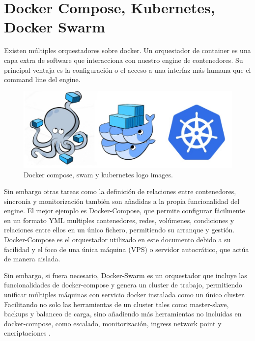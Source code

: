 \section{Docker Compose, Kubernetes, Docker Swarm}
Existen múltiples orquestadores sobre docker. Un orquestador de container es una capa extra de software que interacciona con nuestro engine de contenedores. Su principal ventaja es la configuración o el acceso a una interfaz más humana que el command line del engine. 

\begin{figure}[!htb]
\begin{center}
\includegraphics[width=1\textwidth]{./figuras/docker_compose_swam_kubernates.jpg}
\caption{Docker compose, swam y kubernetes logo images\cite{i_orquestadores}.}
\label{F:docker_compose_swam_kubernates}
\end{center}
\end{figure}
Sin embargo otras tareas como la definición de relaciones entre contenedores, sincronía y monitorización también son añadidas a la propia funcionalidad del engine. El mejor ejemplo es Docker-Compose\cite{c_docker_compose}, que permite configurar fácilmente en un formato YML multiples contenedores, redes, volúmenes, condiciones y relaciones entre ellos en un único fichero, permitiendo su arranque y gestión. Docker-Compose es el orquestador utilizado en este documento debido a su facilidad y el foco de una única máquina (VPS) o servidor autocrático, que actúa de manera aislada.

Sin embargo, si fuera necesario, Docker-Swarm\cite{c_docker_swarm} es un orquestador que incluye las funcionalidades de docker-compose y genera un cluster de trabajo, permitiendo unificar múltiples máquinas con servicio docker instalada como un único cluster. Facilitando no solo las herramientas de un cluster tales como master-slave, backups y balanceo de carga, sino añadiendo más herramientas no incluidas en docker-compose, como escalado, monitorización, ingress network point y encriptaciones .

